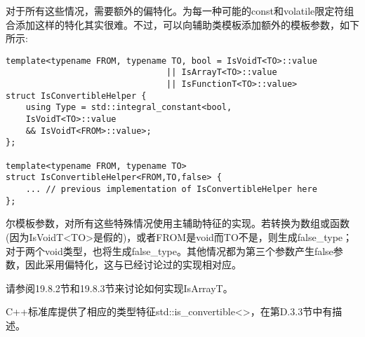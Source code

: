 对于所有这些情况，需要额外的偏特化。为每一种可能的const和volatile限定符组合添加这样的特化其实很难。不过，可以向辅助类模板添加额外的模板参数，如下所示:

\begin{lstlisting}[style=styleCXX]
template<typename FROM, typename TO, bool = IsVoidT<TO>::value
								|| IsArrayT<TO>::value
								|| IsFunctionT<TO>::value>
struct IsConvertibleHelper {
	using Type = std::integral_constant<bool,
	IsVoidT<TO>::value
	&& IsVoidT<FROM>::value>;
};

template<typename FROM, typename TO>
struct IsConvertibleHelper<FROM,TO,false> {
	... // previous implementation of IsConvertibleHelper here
};
\end{lstlisting}

尔模板参数，对所有这些特殊情况使用主辅助特征的实现。若转换为数组或函数(因为IsVoidT<TO>是假的)，或者FROM是void而TO不是，则生成false\_type；对于两个void类型，也将生成false\_type。其他情况都为第三个参数产生false参数，因此采用偏特化，这与已经讨论过的实现相对应。

请参阅19.8.2节和19.8.3节来讨论如何实现IsArrayT。

C++标准库提供了相应的类型特征std::is\_convertible<>，在第D.3.3节中有描述。



